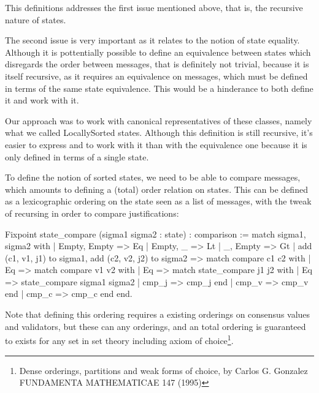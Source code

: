 This definitions addresses the first issue mentioned above, that is, the 
recursive nature of states.

The second issue is very important as it relates to the notion of
state equality.
Although it is pottentially possible to define an equivalence between
states which disregards the order between messages, that is definitely
not trivial, because it is itself recursive, as it requires an equivalence
on messages, which must be defined in terms of the same state equivalence.
This would be a hinderance to both define it and work with it.

Our approach was to work with canonical representatives of these classes,
namely what we called LocallySorted states.  Although this definition
is still recursive, it's easier to express and to work with it than with the
equivalence one because it is only defined in terms of a single state.

To define the notion of sorted states, we need to be able to compare messages,
which amounts to defining a (total) order relation on states.
This can be defined as a lexicographic ordering on the state seen as a list
of messages, with the tweak of recursing in order to compare justifications:

\begin{coq}
Fixpoint state_compare (sigma1 sigma2 : state) : comparison :=
  match sigma1, sigma2 with
  | Empty, Empty => Eq
  | Empty, _ => Lt
  | _, Empty => Gt
  | add (c1, v1, j1) to sigma1, add (c2, v2, j2) to sigma2 =>
    match compare c1 c2 with
    | Eq =>
      match compare v1 v2 with
      | Eq =>
        match state_compare j1 j2 with
        | Eq => state_compare sigma1 sigma2
        | cmp_j => cmp_j
        end
      | cmp_v => cmp_v
      end
    | cmp_c => cmp_c
    end
  end.
\end{coq}

Note that defining this ordering requires a existing orderings on
consensus values and validators, but these can any orderings,
and an total ordering is guaranteed to exists for any set in set theory
including axiom of choice\footnote{Dense orderings, partitions and weak
forms of choice, by Carlos G. Gonzalez FUNDAMENTA MATHEMATICAE 147 (1995)}.
    

